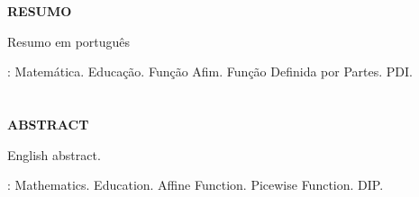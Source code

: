 \chapter*{}
\vspace{-4cm}
\begin{center}
 \textbf{RESUMO}
\end{center}
\vspace{0.5cm}
\noindent
Resumo em português

\vspace{1cm}

: Matemática. Educação. Função Afim. Função Definida por Partes. PDI.   


\chapter*{}
\vspace{-4cm}
\begin{center}
 \textbf{ABSTRACT}
\end{center}
\vspace{0.5cm}
\noindent
English abstract.
\vspace{1cm}

: Mathematics. Education. Affine Function. Picewise Function. DIP.


